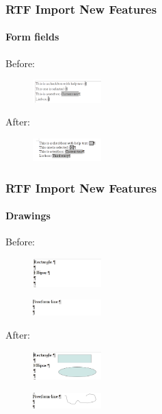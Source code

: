 \documentclass{beamer}
\begin{document}
\begin{frame}
\frametitle{RTF Import New Features}
\framesubtitle{Form fields}
Before:
\begin{figure}[H]
\includegraphics[width=100px,keepaspectratio]{pic/form-old.png}
\end{figure}
After:
\begin{figure}[H]
\includegraphics[width=100px,keepaspectratio]{pic/form-new.png}
\end{figure}
\end{frame}

\begin{frame}
\frametitle{RTF Import New Features}
\framesubtitle{Drawings}
Before:
\begin{figure}[H]
\includegraphics[width=100px,keepaspectratio]{pic/draw-old.png}
\end{figure}
\begin{figure}[H]
\includegraphics[width=100px,keepaspectratio]{pic/freeform-old.png}
\end{figure}
After:
\begin{figure}[H]
\includegraphics[width=100px,keepaspectratio]{pic/draw-new.png}
\end{figure}
\begin{figure}[H]
\includegraphics[width=100px,keepaspectratio]{pic/freeform-new.png}
\end{figure}
\end{frame}
\end{document}
